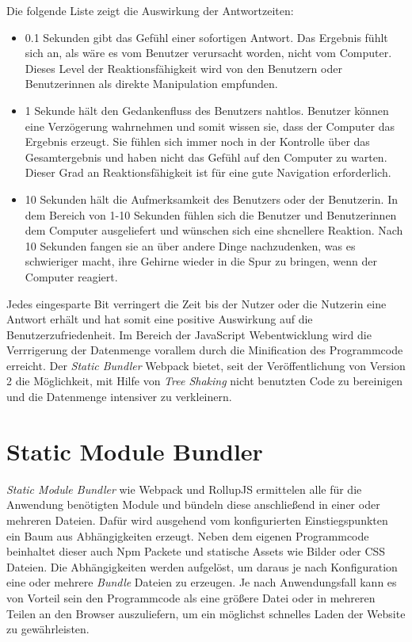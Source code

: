 Die folgende Liste zeigt die Auswirkung der Antwortzeiten:
\begin{itemize}
\item 0.1 Sekunden gibt das Gefühl einer sofortigen Antwort. Das Ergebnis fühlt sich an, als wäre es vom Benutzer verursacht worden, nicht vom Computer. Dieses Level der Reaktionsfähigkeit wird von den Benutzern oder Benutzerinnen als direkte Manipulation empfunden.
\item 1 Sekunde hält den Gedankenfluss des Benutzers nahtlos. Benutzer können eine Verzögerung wahrnehmen und somit wissen sie, dass der Computer das Ergebnis erzeugt. Sie fühlen sich immer noch in der Kontrolle über das Gesamtergebnis und haben nicht das Gefühl auf den Computer zu warten. Dieser Grad an Reaktionsfähigkeit ist für eine gute Navigation erforderlich.
\item 10 Sekunden hält die Aufmerksamkeit des Benutzers oder der Benutzerin. In dem Bereich von 1-10 Sekunden fühlen sich die Benutzer und Benutzerinnen dem Computer ausgeliefert und wünschen sich eine shcnellere Reaktion. Nach 10 Sekunden fangen sie an über andere Dinge nachzudenken, was es schwieriger macht, ihre Gehirne wieder in die Spur zu bringen, wenn der Computer reagiert.
\end{itemize}

Jedes eingesparte Bit verringert die Zeit bis der Nutzer oder die Nutzerin eine Antwort erhält und hat somit eine positive Auswirkung auf die Benutzerzufriedenheit. Im Bereich der JavaScript Webentwicklung wird die Verrrigerung der Datenmenge vorallem durch die Minification des Programmcode erreicht. Der \textit{Static Bundler} Webpack bietet, seit der Veröffentlichung von Version 2 die Möglichkeit, mit Hilfe von \textit{Tree Shaking} nicht benutzten Code zu bereinigen und die Datenmenge intensiver zu verkleinern. \autocite{WebpackTreeShaking}


\section{Static Module Bundler}
\textit{Static Module Bundler} wie Webpack und RollupJS ermittelen alle für die Anwendung benötigten Module und bündeln diese anschließend in einer oder mehreren Dateien. Dafür wird ausgehend vom konfigurierten Einstiegspunkten ein Baum aus Abhängigkeiten erzeugt. Neben dem eigenen Programmcode beinhaltet dieser auch Npm Packete und statische Assets wie Bilder oder CSS Dateien. Die Abhängigkeiten werden aufgelöst, um daraus je nach Konfiguration eine oder mehrere \textit{Bundle} Dateien zu erzeugen. Je nach Anwendungsfall kann es von Vorteil sein den Programmcode als eine größere Datei oder in mehreren Teilen an den Browser auszuliefern, um ein möglichst schnelles Laden der Website zu gewährleisten.
\autocite{RollupJSDocs,WebpackConcepts}

